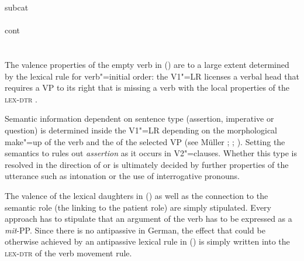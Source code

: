 \begin{exe}
\begin{xlist}[iv.]
\begin{exe}
\begin{xlist}[iv.]
{{{{{                                           subcat     \\
                                         }\\
                            cont  \\
                          }\\
}\\
}}
\z
%
The valence properties of the empty verb in () are to a large extent determined by the lexical rule for verb"=initial order: the V1"=LR licenses a verbal head
that requires a VP to its right that is missing a verb with the local properties of the \textsc{lex-dtr} .

Semantic information dependent on sentence type (assertion, imperative or question) is determined inside the V1"=LR depending on the morphological
make"=up of the verb and the \slashv of the selected VP (see Müller
\citeyear[Section~10.3]{MuellerLehrbuch1}; \citeyear{MuellerSatztypen}; \citeyear{MuellerGS}).
Setting the semantics to   rules out \emph{assertion} as it occurs in V2"=clauses.
Whether this type is resolved in the direction of  or
 is ultimately decided by further properties of the utterance such as intonation or the use of interrogative pronouns.

The valence of the lexical daughters in () as well as the connection to the semantic role (the linking to the patient role) are simply stipulated.
Every approach has to stipulate that an argument of the verb has to be expressed as a \emph{mit}-PP. Since there is no antipassive in German,
the effect that could be otherwise achieved by an antipassive lexical rule in () is simply written into the \textsc{lex-dtr} of the verb movement rule.


\end{xlist}
\end{exe}
\end{xlist}
\end{exe}
